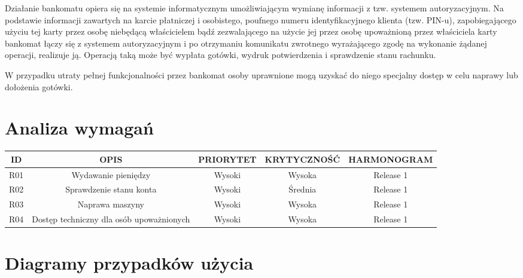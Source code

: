\documentclass[a4paper, 11pt]{article}
\begin{document}
	Działanie bankomatu opiera się  na systemie informatycznym umożliwiającym wymianę informacji z tzw. systemem autoryzacyjnym. Na podstawie informacji zawartych na karcie płatniczej i osobistego, poufnego numeru identyfikacyjnego klienta (tzw. PIN-u), zapobiegającego użyciu tej karty przez osobę niebędącą właścicielem bądź zezwalającego na użycie jej przez osobę upoważnioną przez właściciela karty bankomat łączy się z systemem autoryzacyjnym i po otrzymaniu komunikatu zwrotnego wyrażającego zgodę na wykonanie żądanej operacji, realizuje ją. Operacją taką może być wypłata  gotówki, wydruk potwierdzenia i sprawdzenie stanu rachunku.
	
	W przypadku utraty pełnej funkcjonalności przez bankomat osoby uprawnione mogą uzyskać do niego specjalny dostęp w celu naprawy lub dołożenia gotówki.
	
	\section{Analiza wymagań}
	\indent
		
	\begin{minipage}[t]{0.8\textwidth}                          %
		\begin{center}
			\begin{adjustbox}{center, width=\columnwidth}     	
		
		
	\begin{tabular}{|c|c|c|c|c|}
		\hline ID & OPIS & PRIORYTET & KRYTYCZNOŚĆ & HARMONOGRAM  \\ 
		\hline R01 & Wydawanie pieniędzy & Wysoki & Wysoka & Release 1 \\ 
		\hline R02 & Sprawdzenie stanu konta &  Wysoki & Średnia &  Release 1  \\ 
		\hline  R03 & Naprawa maszyny &  Wysoki & Wysoka &  Release 1  \\ 
		\hline  R04 & Dostęp techniczny dla osób upoważnionych &  Wysoki & Wysoka &  Release 1  \\ 
		\hline 
	\end{tabular} 
		
		
\end{adjustbox}
\end{center}
\end{minipage}		
		
		
	
	\section{Diagramy przypadków użycia}
	\indent
		
\end{document}
